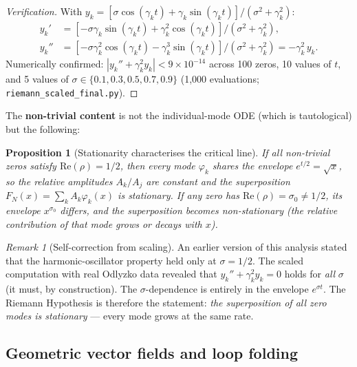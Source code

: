 \documentclass[11pt,a4paper]{article}
\theoremstyle{plain}
\newtheorem{proposition}[theorem]{Proposition}
\theoremstyle{definition}
\theoremstyle{remark}
\newtheorem{remark}[theorem]{Remark}
\begin{document}
\begin{proof}[Verification]
With $y_k = [\sigma\cos(\gamma_k t) + \gamma_k\sin(\gamma_k t)]/(\sigma^2 + \gamma_k^2)$:
\begin{align*}
  y_k' &= [-\sigma\gamma_k\sin(\gamma_k t) + \gamma_k^2\cos(\gamma_k t)] / (\sigma^2 + \gamma_k^2), \\
  y_k'' &= [-\sigma\gamma_k^2\cos(\gamma_k t) - \gamma_k^3\sin(\gamma_k t)] / (\sigma^2 + \gamma_k^2)
         = -\gamma_k^2\, y_k.
\end{align*}
Numerically confirmed: $|y_k'' + \gamma_k^2 y_k| < 9 \times 10^{-14}$
across 100 zeros, 10 values of $t$, and 5 values of $\sigma \in \{0.1, 0.3, 0.5, 0.7, 0.9\}$
(1{,}000 evaluations; \texttt{riemann\_scaled\_final.py}).
\end{proof}

The \textbf{non-trivial content} is not the individual-mode ODE (which
is tautological) but the following:

\begin{proposition}[Stationarity characterises the critical line]\label{prop:stationarity}
If all non-trivial zeros satisfy $\mathrm{Re}(\rho) = 1/2$, then
every mode $\varphi_k$ shares the envelope $e^{t/2} = \sqrt{x}$, so
the relative amplitudes $A_k/A_j$ are constant and the superposition
$F_N(x) = \sum_k A_k\varphi_k(x)$ is stationary.  If any zero has
$\mathrm{Re}(\rho) = \sigma_0 \neq 1/2$, its envelope $x^{\sigma_0}$
differs, and the superposition becomes non-stationary (the relative
contribution of that mode grows or decays with $x$).
\end{proposition}

\begin{remark}[Self-correction from scaling]\label{rem:self-correction}
An earlier version of this analysis stated that the harmonic-oscillator
property held only at $\sigma = 1/2$.  The scaled computation with real
Odlyzko data revealed that $y_k'' + \gamma_k^2 y_k = 0$ holds for
\emph{all} $\sigma$ (it must, by construction).  The $\sigma$-dependence
is entirely in the envelope $e^{\sigma t}$.
The Riemann Hypothesis is therefore the statement:
\emph{the superposition of all zero modes is stationary} ---
every mode grows at the same rate.
\end{remark}

\subsection{Geometric vector fields and loop folding}
\end{document}
